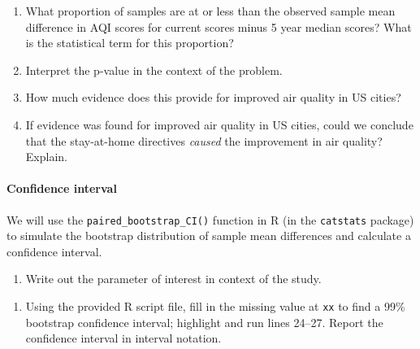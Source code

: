 \documentclass[
]{report}
\providecommand{\tightlist}{%
  \setlength{\itemsep}{0pt}\setlength{\parskip}{0pt}}
\begin{document}
\vspace{.5in}

\begin{enumerate}
\def\labelenumi{\arabic{enumi}.}
\setcounter{enumi}{11}
\item
  What proportion of samples are at or less than the observed sample mean difference in AQI scores for current scores minus 5 year median scores? What is the statistical term for this proportion?
  \vspace{.3in}
\item
  Interpret the p-value in the context of the problem.
  \vspace{.8in}
\item
  How much evidence does this provide for improved air quality in US cities?
  \vspace{.3in}
\item
  If evidence was found for improved air quality in US cities, could we conclude that the stay-at-home directives \emph{caused} the improvement in air quality? Explain.
  \vspace{.5in}
\end{enumerate}

\hypertarget{confidence-interval-3}{%
\paragraph*{Confidence interval}\label{confidence-interval-3}}

We will use the \texttt{paired\_bootstrap\_CI()} function in R (in the \texttt{catstats} package) to simulate the bootstrap distribution of sample mean differences and calculate a confidence interval.

\begin{enumerate}
\def\labelenumi{\arabic{enumi}.}
\setcounter{enumi}{15}
\tightlist
\item
  Write out the parameter of interest in context of the study.
\end{enumerate}

\vspace{0.8in}

\begin{enumerate}
\def\labelenumi{\arabic{enumi}.}
\setcounter{enumi}{16}
\tightlist
\item
  Using the provided R script file, fill in the missing value at \texttt{xx} to find a 99\% bootstrap confidence interval; highlight and run lines 24--27. Report the confidence interval in interval notation.
\end{enumerate}
\end{document}
